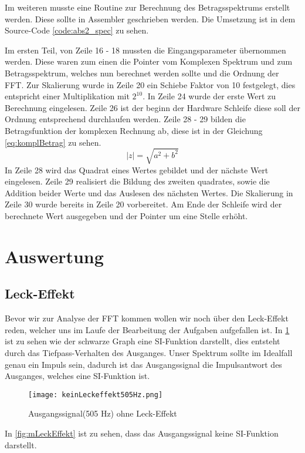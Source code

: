 Im weiteren musste eine Routine zur Berechnung des Betragsspektrums erstellt werden. Diese sollte in Assembler geschrieben werden. Die Umsetzung ist in dem Source-Code \autoref{code:abs2_spec} zu sehen.
\label{code:abs2_spec}

Im ersten Teil, von Zeile 16 - 18 mussten die Eingangsparameter übernommen werden. Diese waren zum einen  die Pointer vom Komplexen Spektrum und zum Betragsspektrum, welches nun berechnet werden sollte und die Ordnung der FFT.
Zur Skalierung wurde in Zeile 20 ein Schiebe Faktor von 10 festgelegt, dies entspricht einer Multiplikation mit \begin{math}2^{10}\end{math}.
In Zeile 24 wurde der erste Wert zu Berechnung eingelesen. Zeile 26 ist der beginn der Hardware Schleife diese soll der Ordnung entsprechend durchlaufen werden. Zeile 28 - 29 bilden die Betragsfunktion der komplexen Rechnung ab, diese ist in der Gleichung \ref{eq:komplBetrag} zu sehen.
\begin{equation}
\label{eq:komplBetrag}
	\mid z \mid = \sqrt{a^2 + b^2}
\end{equation} 
In Zeile 28 wird das Quadrat eines Wertes gebildet und der nächste Wert eingelesen. 
Zeile 29 realisiert die Bildung des zweiten quadrates, sowie die Addition beider Werte und das Auslesen des nächsten Wertes. Die Skalierung in Zeile 30 wurde bereits in Zeile 20 vorbereitet.
Am Ende der Schleife wird der berechnete Wert ausgegeben und der Pointer um eine Stelle erhöht. 
\section{Auswertung}\label{AFFToF}
\subsection*{Leck-Effekt}
Bevor wir zur Analyse der FFT kommen wollen wir noch über den Leck-Effekt reden, welcher uns im Laufe der Bearbeitung der Aufgaben aufgefallen ist. In \cref{fig:oLeckEffekt} ist zu sehen wie der schwarze Graph eine SI-Funktion darstellt, dies entsteht durch das Tiefpass-Verhalten des Ausganges. Unser Spektrum sollte im Idealfall genau ein Impuls sein, dadurch ist das Ausgangssignal die Impulsantwort des Ausganges, welches eine SI-Funktion ist. 
\begin{figure}[H]
	\texttt{[image: keinLeckeffekt505Hz.png]}
  \caption{Ausgangssignal(505 Hz) ohne Leck-Effekt}
  \label{fig:oLeckEffekt}
\end{figure}
In \cref{fig:mLeckEffekt} ist zu sehen, dass das Ausgangssignal keine SI-Funktion darstellt.

